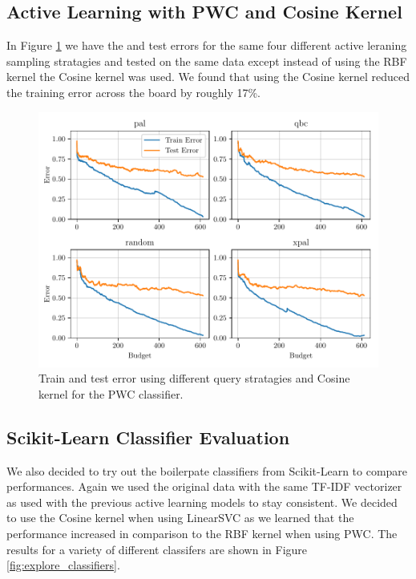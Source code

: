 \subsection{Active Learning with PWC and Cosine Kernel}

In Figure \ref{fig:plot_all_results_cosine} we have the and test errors for the same four different active leraning sampling stratagies and tested on the same data except instead of using the RBF kernel the Cosine kernel was used. We found that using the Cosine kernel reduced the training error across the board by roughly 17\%.  

\begin{figure}[ht]
  \centering
  \includegraphics[width=\textwidth]{../img/plot_all_results_cosine.pdf}
  \caption{Train and test error using different query stratagies and Cosine kernel for the PWC classifier.}
  \label{fig:plot_all_results_cosine}
\end{figure}

\subsection{Scikit-Learn Classifier Evaluation}

We also decided to try out the boilerpate classifiers from Scikit-Learn to compare performances. Again we used the original data with the same TF-IDF vectorizer as used with the previous active learning models to stay consistent. We decided to use the Cosine kernel when using LinearSVC as we learned that the performance increased in comparison to the RBF kernel when using PWC. The results for a variety of different classifers are shown in Figure \ref{fig:explore_classifiers}.


